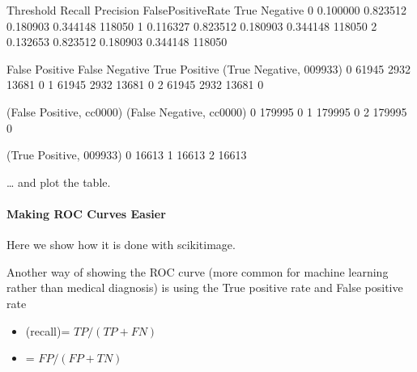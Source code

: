 \documentclass[letterpaper,10pt,english]{sphinxmanual}
\begin{document}
\begin{sphinxVerbatim}[commandchars=\\\{\}]
  
\end{sphinxVerbatim}

\begin{sphinxVerbatim}[commandchars=\\\{\}]
   Threshold    Recall  Precision  False\PYGZus{}Positive\PYGZus{}Rate  True Negative  \PYGZbs{}
0   0.100000  0.823512   0.180903             0.344148         118050   
1   0.116327  0.823512   0.180903             0.344148         118050   
2   0.132653  0.823512   0.180903             0.344148         118050   

   False Positive  False Negative  True Positive  (True Negative, \PYGZsh{}009933)  \PYGZbs{}
0           61945            2932          13681                         0   
1           61945            2932          13681                         0   
2           61945            2932          13681                         0   

   (False Positive, \PYGZsh{}cc0000)  (False Negative, \PYGZsh{}cc0000)  \PYGZbs{}
0                     179995                          0   
1                     179995                          0   
2                     179995                          0   

   (True Positive, \PYGZsh{}009933)  
0                     16613  
1                     16613  
2                     16613  
\end{sphinxVerbatim}

\sphinxAtStartPar
… and plot the table.


\paragraph{Making ROC Curves Easier}
\label{\detokenize{04-BasicSegmentation_Part2:making-roc-curves-easier}}
\sphinxAtStartPar
Here we show how it is done with scikit\sphinxhyphen{}image.

\sphinxAtStartPar
Another way of showing the ROC curve (more common for machine learning rather than medical diagnosis) is using the True positive rate and False positive rate
\begin{itemize}
\item {} 
\sphinxAtStartPar
{} (recall)= \(TP/(TP+FN)\)

\item {} 
\sphinxAtStartPar
{} = \(FP/(FP+TN)\)

\end{itemize}
\end{document}
